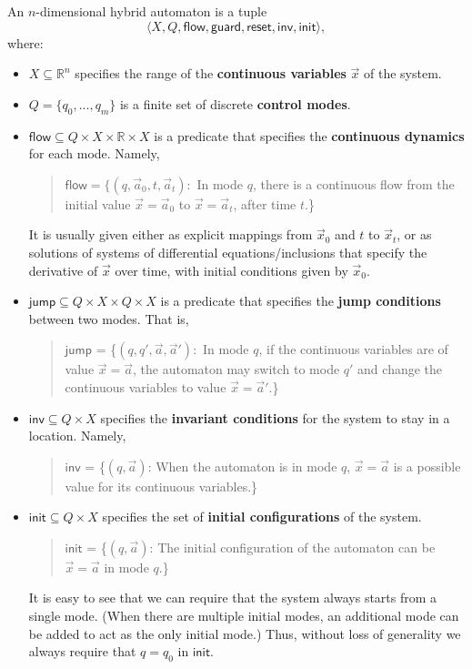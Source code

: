 \documentclass[envcountsect]{llncs}
\newcommand{\flow}{\mathsf{flow}}
\newcommand{\jump}{\mathsf{jump}}
\newcommand{\inv}{\mathsf{inv}}
\newcommand{\init}{\mathsf{init}}
\newcommand{\guard}{\mathsf{guard}}
\newcommand{\reset}{\mathsf{reset}}
\newcommand{\R}{\mathbb{R}}
\begin{document}
\begin{definition}\label{auto-def}
An $n$-dimensional hybrid automaton is a tuple $$\langle X, Q, \flow, \guard, \reset, \inv, \init\rangle,$$ where:
\begin{itemize}
\item $X\subseteq \mathbb{R}^n$ specifies the range of the {\bf continuous variables} $\vec x$ of the system. 
\item $Q=\{q_0,...,q_m\}$ is a finite set of discrete {\bf control modes}. 
\item $\flow \subseteq Q\times X\times \R \times X$ is a predicate that specifies the {\bf continuous dynamics} for each mode. Namely, 
\begin{quote}
$\flow = \{(q, \vec a_0, t, \vec a_t):$ In mode $q$, there is a continuous flow from the initial value $\vec x = \vec a_0$ to $\vec x = \vec a_t$, after time $t$.\}
\end{quote}
It is usually given either as explicit mappings from $\vec x_0$ and $t$ to $\vec x_t$, or as solutions of systems of differential equations/inclusions that specify the derivative of $\vec x$ over time, with initial conditions given by $\vec x_0$. 

\item $\jump\subseteq Q\times X\times Q\times X$ is a predicate that specifies the {\bf jump conditions} between two modes. That is,  
\begin{quote}
$\jump$ = \{$(q,q',\vec a,\vec a'):$ In mode $q$, if the continuous variables are of value $\vec x = \vec a$, the automaton may switch to mode $q'$ and change the continuous variables to value $\vec x = \vec a'$.\}
\end{quote}

\item $\inv \subseteq Q\times X$ specifies the {\bf invariant conditions} for the system to stay in a location. Namely,
\begin{quote}
$\inv$ = \{$(q,\vec a)$: When the automaton is in mode $q$, $\vec x = \vec a$ is a possible value for its continuous variables.\}
\end{quote}

\item $\init \subseteq Q\times X$ specifies the set of {\bf initial configurations} of the system. 
\begin{quote}
$\init$ = \{$(q, \vec a)$: The initial configuration of the automaton can be $\vec x = \vec a$ in mode $q$.\}
\end{quote}
It is easy to see that we can require that the system always starts from a single mode. (When there are multiple initial modes, an additional mode can be added to act as the only initial mode.) Thus, without loss of generality we always require that $q=q_0$ in $\init$. 
\end{itemize}
\end{definition}
\end{document}
